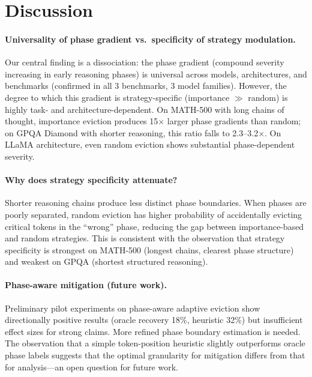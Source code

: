 \documentclass[11pt,a4paper]{article}
\begin{document}
\section{Discussion}

\paragraph{Universality of phase gradient vs.\ specificity of strategy modulation.} Our central finding is a dissociation: the phase gradient (compound severity increasing in early reasoning phases) is universal across models, architectures, and benchmarks (confirmed in all 3 benchmarks, 3 model families). However, the degree to which this gradient is strategy-specific (importance $\gg$ random) is highly task- and architecture-dependent. On MATH-500 with long chains of thought, importance eviction produces 15$\times$ larger phase gradients than random; on GPQA Diamond with shorter reasoning, this ratio falls to 2.3--3.2$\times$. On LLaMA architecture, even random eviction shows substantial phase-dependent severity.

\paragraph{Why does strategy specificity attenuate?} Shorter reasoning chains produce less distinct phase boundaries. When phases are poorly separated, random eviction has higher probability of accidentally evicting critical tokens in the ``wrong'' phase, reducing the gap between importance-based and random strategies. This is consistent with the observation that strategy specificity is strongest on MATH-500 (longest chains, clearest phase structure) and weakest on GPQA (shortest structured reasoning).

\paragraph{Phase-aware mitigation (future work).} Preliminary pilot experiments on phase-aware adaptive eviction show directionally positive results (oracle recovery 18\%, heuristic 32\%) but insufficient effect sizes for strong claims. More refined phase boundary estimation is needed. The observation that a simple token-position heuristic slightly outperforms oracle phase labels suggests that the optimal granularity for mitigation differs from that for analysis---an open question for future work.
\end{document}
